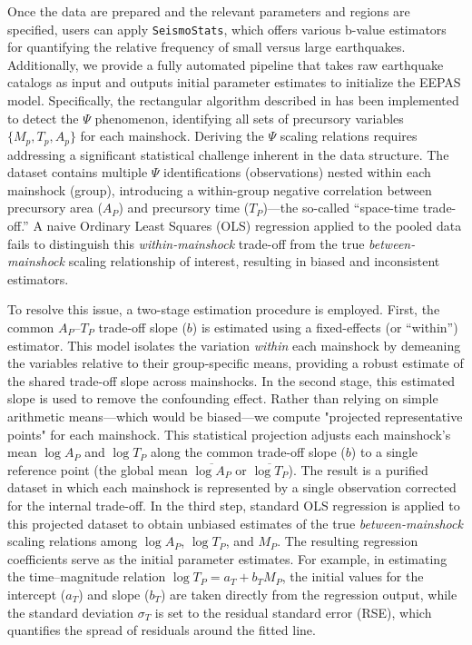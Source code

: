 \documentclass[extra,mreferee]{gji}
\theoremstyle{lemma}
\begin{document}
Once the data are prepared and the relevant parameters and regions are specified, users can apply \texttt{SeismoStats}, which offers various b-value estimators for quantifying the relative frequency of small versus large earthquakes. Additionally, we provide a fully automated pipeline that takes raw earthquake catalogs as input and outputs initial parameter estimates to initialize the EEPAS model. Specifically, the rectangular algorithm described in \cite{psi} has been implemented to detect the $\Psi$ phenomenon, identifying all sets of precursory variables $\{M_p, T_p, A_p\}$ for each mainshock. Deriving the $\Psi$ scaling relations requires addressing a significant statistical challenge inherent in the data structure. The dataset contains multiple $\Psi$ identifications (observations) nested within each mainshock (group), introducing a within-group negative correlation between precursory area ($A_P$) and precursory time ($T_P$)—the so-called “space-time trade-off.” A naive Ordinary Least Squares (OLS) regression applied to the pooled data fails to distinguish this \textit{within-mainshock} trade-off from the true \textit{between-mainshock} scaling relationship of interest, resulting in biased and inconsistent estimators.

To resolve this issue, a two-stage estimation procedure is employed. First, the common $A_P$–$T_P$ trade-off slope ($b$) is estimated using a fixed-effects (or “within”) estimator. This model isolates the variation \textit{within} each mainshock by demeaning the variables relative to their group-specific means, providing a robust estimate of the shared trade-off slope across mainshocks. In the second stage, this estimated slope is used to remove the confounding effect. Rather than relying on simple arithmetic means—which would be biased—we compute "projected representative points" for each mainshock. This statistical projection adjusts each mainshock’s mean $\log A_P$ and $\log T_P$ along the common trade-off slope ($b$) to a single reference point (the global mean $\overline{\log A_P}$ or $\overline{\log T_P}$). The result is a purified dataset in which each mainshock is represented by a single observation corrected for the internal trade-off. In the third step, standard OLS regression is applied to this projected dataset to obtain unbiased estimates of the true \textit{between-mainshock} scaling relations among $\log A_P$, $\log T_P$, and $M_P$. The resulting regression coefficients serve as the initial parameter estimates. For example, in estimating the time–magnitude relation $\log T_P = a_T + b_T M_P$, the initial values for the intercept ($a_T$) and slope ($b_T$) are taken directly from the regression output, while the standard deviation $\sigma_T$ is set to the residual standard error (RSE), which quantifies the spread of residuals around the fitted line.
\end{document}
